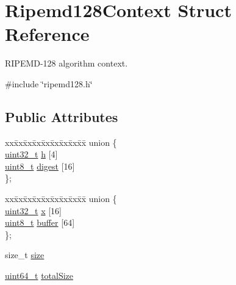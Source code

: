 \hypertarget{structRipemd128Context}{}\section{Ripemd128\+Context Struct Reference}
\label{structRipemd128Context}


R\+I\+P\+E\+M\+D-\/128 algorithm context.  




{\ttfamily \#include \char`\"{}ripemd128.\+h\char`\"{}}

\subsection*{Public Attributes}
\begin{DoxyCompactItemize}
\item 
\begin{tabbing}
xx\=xx\=xx\=xx\=xx\=xx\=xx\=xx\=xx\=\kill
union \{\\
\>\hyperlink{stdint_8h_a435d1572bf3f880d55459d9805097f62}{uint32\_t} \hyperlink{structRipemd128Context_a8b4ec53886b8659a94892bb63c66a3a1}{h} \mbox{[}4\mbox{]}\\
\>\hyperlink{stdint_8h_aba7bc1797add20fe3efdf37ced1182c5}{uint8\_t} \hyperlink{structRipemd128Context_ad4489484e8873cd94cd7989ad375bb6e}{digest} \mbox{[}16\mbox{]}\\
\}; \\

\end{tabbing}\item 
\begin{tabbing}
xx\=xx\=xx\=xx\=xx\=xx\=xx\=xx\=xx\=\kill
union \{\\
\>\hyperlink{stdint_8h_a435d1572bf3f880d55459d9805097f62}{uint32\_t} \hyperlink{structRipemd128Context_a87f08b90480c53e7d624449e178339c9}{x} \mbox{[}16\mbox{]}\\
\>\hyperlink{stdint_8h_aba7bc1797add20fe3efdf37ced1182c5}{uint8\_t} \hyperlink{structRipemd128Context_a8774c12459fe6591351e4e9c25841cc6}{buffer} \mbox{[}64\mbox{]}\\
\}; \\

\end{tabbing}\item 
size\+\_\+t \hyperlink{structRipemd128Context_af726b1c8f3d25c78e280318febcf201f}{size}
\item 
\hyperlink{stdint_8h_aec6fcb673ff035718c238c8c9d544c47}{uint64\+\_\+t} \hyperlink{structRipemd128Context_a145c1c9e3d660df845d115ba0bfd5c81}{total\+Size}
\end{DoxyCompactItemize}


